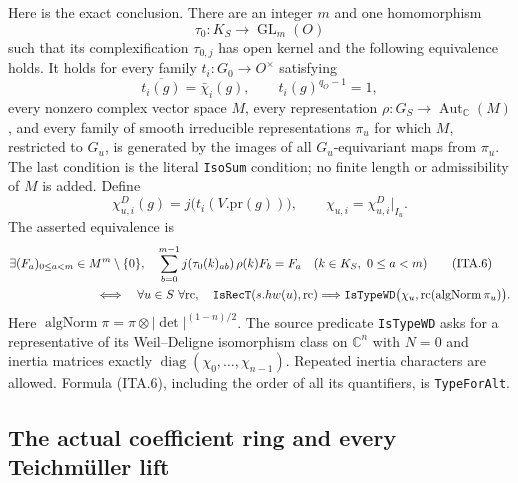 Here is the exact conclusion.  There are an integer $m$ and one
homomorphism
\[
                    \tau_0:K_S\longrightarrow\operatorname{GL}_m(O)
 \tag{ITA.3}
\]
such that its complexification $\tau_{0,j}$ has open kernel and
the following equivalence holds.  It holds for every family
$t_i:G_0\to O^\times$ satisfying
\[
 \overline{t_i(g)}=\bar\chi_i(g),\qquad
                       t_i(g)^{q_O-1}=1,                    \tag{ITA.4}
\]
every nonzero complex vector space $M$, every representation
$\rho:G_S\to\operatorname{Aut}_{\mathbb C}(M)$, and every
family of smooth irreducible representations $\pi_u$ for which
$M$, restricted to $G_u$, is generated by the images of all
$G_u$-equivariant maps from $\pi_u$.  The last condition is the
literal \texttt{IsoSum} condition; no finite length or
admissibility of $M$ is added.  Define
\[
 \chi^D_{u,i}(g)=j\bigl(t_i(V.\mathrm{pr}(g))\bigr),\qquad
                              \chi_{u,i}=\chi^D_{u,i}|_{I_u}.
 \tag{ITA.5}
\]
The asserted equivalence is
\begin{align}
 &\exists (F_a)_{0\leq a<m}\in M^m\setminus\{0\},\quad
   \sum_{b=0}^{m-1}j(\tau_0(k)_{ab})\,\rho(k)F_b=F_a
                 \quad(k\in K_S,\ 0\leq a<m)
                                                        \tag{ITA.6}\\
 &\hspace{25mm}\Longleftrightarrow\quad
   \forall u\in S\ \forall\mathrm{rc},\quad
   \texttt{IsRecT}(s.hw(u),\mathrm{rc})\Longrightarrow
   \texttt{IsTypeWD}\bigl(\chi_u,
                       \mathrm{rc}(\operatorname{algNorm}\pi_u)\bigr).
                                                        \notag
\end{align}
Here
$\operatorname{algNorm}\pi=\pi\otimes|\det|^{(1-n)/2}$.
The source predicate \texttt{IsTypeWD} asks for a representative
of its Weil--Deligne isomorphism class on $\mathbb C^n$ with
$N=0$ and inertia matrices exactly
$\operatorname{diag}(\chi_0,\ldots,\chi_{n-1})$.  Repeated
inertia characters are allowed.  Formula (ITA.6), including the
order of all its quantifiers, is \texttt{TypeForAlt}.

\subsection{The actual coefficient ring and every Teichm\"uller lift}

